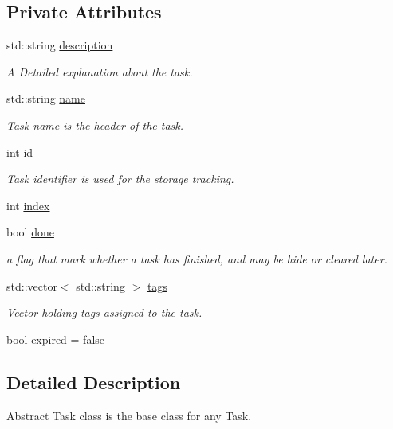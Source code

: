 \subsection*{Private Attributes}
\begin{DoxyCompactItemize}
\item 
std\+::string \hyperlink{class_do_lah_1_1_abstract_task_a3db5bb82f4afb67fe7ac19a866f161d0}{description}
\begin{DoxyCompactList}\small\item\em A Detailed explanation about the task. \end{DoxyCompactList}\item 
std\+::string \hyperlink{class_do_lah_1_1_abstract_task_a0d5e0174ffcd6b8e0f152130ede57fcb}{name}
\begin{DoxyCompactList}\small\item\em Task name is the header of the task. \end{DoxyCompactList}\item 
int \hyperlink{class_do_lah_1_1_abstract_task_a2ad7d227c4ab1ac0768a7633419f0934}{id}
\begin{DoxyCompactList}\small\item\em Task identifier is used for the storage tracking. \end{DoxyCompactList}\item 
int \hyperlink{class_do_lah_1_1_abstract_task_a473c5889b75b19da3e81424e3710075e}{index}
\item 
bool \hyperlink{class_do_lah_1_1_abstract_task_a52d0b20701f38574b77811cd002b65ad}{done}
\begin{DoxyCompactList}\small\item\em a flag that mark whether a task has finished, and may be hide or cleared later. \end{DoxyCompactList}\item 
std\+::vector$<$ std\+::string $>$ \hyperlink{class_do_lah_1_1_abstract_task_aeffd99b2d49c068eaff0fe305464546d}{tags}
\begin{DoxyCompactList}\small\item\em Vector holding tags assigned to the task. \end{DoxyCompactList}\item 
bool \hyperlink{class_do_lah_1_1_abstract_task_afdee8129f634d24d559670e8da94b1a2}{expired} = false
\end{DoxyCompactItemize}


\subsection{Detailed Description}
Abstract Task class is the base class for any Task. 

